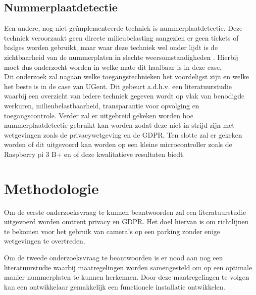 \subsection{Nummerplaatdetectie}
Een andere, nog niet geïmplementeerde techniek is nummerplaatdetectie. Deze techniek veroorzaakt geen directe milieubelasting aangezien er geen tickets of badges worden gebruikt, maar waar deze techniek wel onder lijdt is de zichtbaarheid van de nummerplaten in slechte weersomstandigheden \autocite{azam2016automatic}. Hierbij moet dus onderzocht worden in welke mate dit haalbaar is in deze case.
\\
Dit onderzoek zal nagaan welke toegangstechnieken het voordeligst zijn en welke het beste is in de case van UGent. Dit gebeurt a.d.h.v. een literatuurstudie waarbij een overzicht van iedere techniek gegeven wordt op vlak van benodigde werkuren, milieubelastbaarheid, transparantie voor opvolging en toegangscontrole. Verder zal er uitgebreid gekeken worden hoe nummerplaatdetectie gebruikt kan worden zodat deze niet in strijd zijn met wetgevingen zoals de privacywetgeving en de GDPR. Ten slotte zal er gekeken worden of dit uitgevoerd kan worden op een kleine microcontroller zoals de Raspberry pi 3 B+ en of deze kwalitatieve resultaten biedt.


\section{Methodologie}
\label{sec:methodologie}

Om de eerste onderzoeksvraag te kunnen beantwoorden zal een literatuurstudie uitgevoerd worden omtrent privacy en GDPR. Het doel hiervan is om richtlijnen te bekomen voor het gebruik van camera’s op een parking zonder enige wetgevingen te overtreden.

Om de tweede onderzoeksvraag te beantwoorden is er nood aan nog een literatuurstudie waarbij maatregelingen worden samengesteld om op een optimale manier nummerplaten te kunnen herkennen. Door deze maatregelingen te volgen kan een ontwikkelaar gemakkelijk een functionele installatie ontwikkelen.

